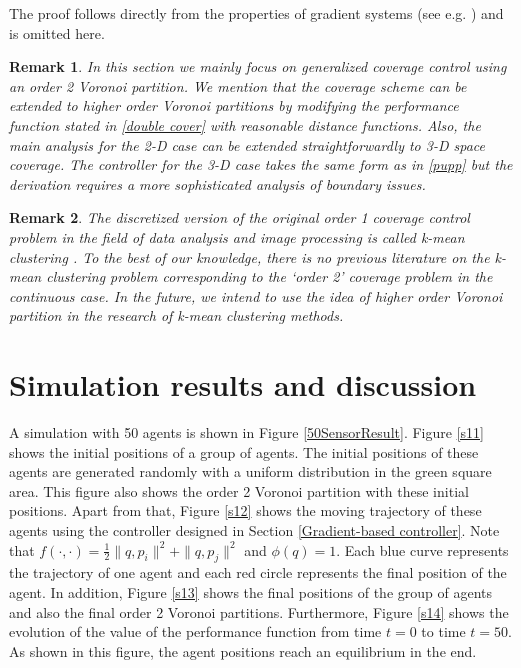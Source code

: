 \documentclass[letterpaper, 10 pt, conference]{ieeeconf}
\newtheorem{remark}{Remark}
\begin{document}
The proof follows directly from the properties of gradient systems (see e.g. \cite{absil2006stable}) and is omitted here.

\begin{remark}
In this section we mainly focus on generalized coverage control using an order 2 Voronoi partition. We mention that the coverage scheme can be extended to higher order Voronoi partitions by modifying the performance function stated in \eqref{double cover} with reasonable distance functions. Also, the main analysis for the 2-D case can be extended straightforwardly to 3-D space coverage. The controller for the 3-D case takes the same form as in \eqref{pupp} but the derivation requires a more sophisticated analysis of boundary issues.
\end{remark}
\begin{remark}
The discretized version of the original order 1 coverage control problem in the field of data analysis and image processing is called k-mean clustering \cite{du1999centroidal}. To the best of our knowledge, there is no previous literature on the k-mean clustering problem corresponding to the `order 2' coverage problem in the continuous case. In the future, we intend to use the idea of higher order Voronoi partition in the research of k-mean clustering methods.
\end{remark}

\section{Simulation results and discussion}





A simulation with 50 agents is shown in Figure \ref{50SensorResult}. Figure \ref{s11} shows the initial positions of a group of agents. The initial positions of these agents are generated randomly with a uniform distribution in the green square area. This figure also shows the order 2 Voronoi partition with these initial positions. Apart from that, Figure \ref{s12} shows the moving trajectory of these agents using the controller designed in Section \ref{Gradient-based controller}. Note that $f(\cdot,\cdot)=\frac{1}{2}\|q,p_i\|^2+\|q,p_j\|^2$ and $\phi(q)=1$. Each blue curve represents the trajectory of one agent and each red circle represents the final position of the agent. In addition, Figure \ref{s13} shows the final positions of the group of agents and also the final order 2 Voronoi partitions. Furthermore, Figure \ref{s14} shows the evolution of the value of the performance function from time $t=0$ to time $t=50$. As shown in this figure, the agent positions reach an equilibrium in the end.
\end{document}
